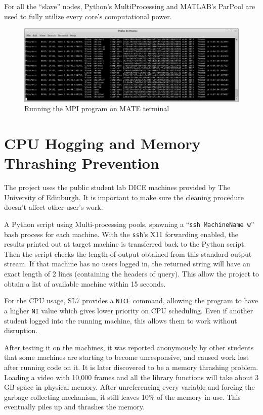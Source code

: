 \documentclass[bsc,logo,twoside,fullspacing,parskip]{infthesis}
\begin{document}
For all the ``slave'' nodes, Python's MultiProcessing and MATLAB's ParPool are used to fully utilize every core's computational power.

\begin{figure}
    \centering
    \includegraphics[scale=0.30]{graph/sample_terminal.png}
    \caption{Running the MPI program on MATE terminal}
    \label{fig:mpi}
\end{figure}

\section{CPU Hogging and Memory Thrashing Prevention}

The project uses the public student lab DICE machines provided by The University of Edinburgh. 
It is important to make sure the cleaning procedure doesn't affect other user's work.

A Python script using Multi-processing pools, spawning a ``{\tt ssh MachineName w}'' bash process for each machine.
With the {\tt ssh}'s X11 forwarding enabled, the results printed out at target machine is transferred back to the Python script. 
Then the script checks the length of output obtained from this standard output stream. 
If that machine has no users logged in, the returned string will have an exact length of 2 lines (containing the headers of query). 
This allow the project to obtain a list of available machine within 15 seconds.

For the CPU usage, SL7 provides a {\tt NICE} command, allowing the program to have a higher {\tt NI} value which gives lower priority on CPU scheduling. Even if another student logged into the running machine, this allows them to work without disruption.

After testing it on the machines, it was reported anonymously by other students that some machines are starting to become unresponsive, and caused work lost after running code on it. It is later discovered to be a memory thrashing problem.
Loading a video with 10,000 frames and all the library functions will take about 3 GB space in physical memory. 
After unreferencing every variable and forcing the garbage collecting mechanism, it still leaves 10\% of the memory in use. This eventually piles up and thrashes the memory. 
\end{document}
